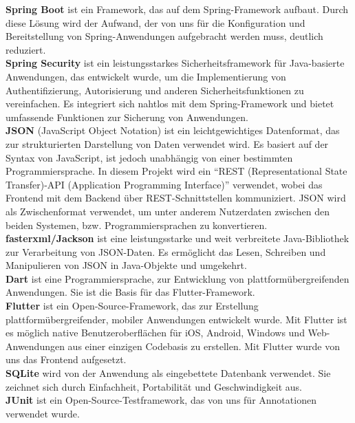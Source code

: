 \textbf{Spring Boot} ist ein Framework, das auf dem Spring-Framework aufbaut.
Durch diese Lösung wird der Aufwand, der von uns für die Konfiguration und Bereitstellung von Spring-Anwendungen aufgebracht werden muss, deutlich reduziert.\\

\textbf{Spring Security} ist ein leistungsstarkes Sicherheitsframework für Java-basierte Anwendungen, das entwickelt wurde,
um die Implementierung von Authentifizierung, Autorisierung und anderen Sicherheitsfunktionen zu vereinfachen.
Es integriert sich nahtlos mit dem Spring-Framework und bietet umfassende Funktionen zur Sicherung von Anwendungen.\\

\textbf{JSON} (JavaScript Object Notation) ist ein leichtgewichtiges Datenformat, das zur strukturierten Darstellung von Daten verwendet wird.
Es basiert auf der Syntax von JavaScript, ist jedoch unabhängig von einer bestimmten Programmiersprache.
In diesem Projekt wird ein \enquote{REST (Representational State Transfer)-API (Application Programming Interface)} verwendet,
wobei das Frontend mit dem Backend über REST-Schnittstellen kommuniziert.
JSON wird als Zwischenformat verwendet, um unter anderem Nutzerdaten zwischen den beiden Systemen, bzw. Programmiersprachen zu konvertieren.\\

\textbf{fasterxml/Jackson} ist eine leistungsstarke und weit verbreitete Java-Bibliothek zur Verarbeitung von JSON-Daten.
Es ermöglicht das Lesen, Schreiben und Manipulieren von JSON in Java-Objekte und umgekehrt.\\

\textbf{Dart} ist eine Programmiersprache, zur Entwicklung von plattformübergreifenden Anwendungen.
Sie ist die Basis für das Flutter-Framework.\\

\textbf{Flutter} ist ein Open-Source-Framework, das zur Erstellung plattformübergreifender, mobiler Anwendungen entwickelt wurde.
Mit Flutter ist es möglich native Benutzeroberflächen für iOS, Android, Windows und Web-Anwendungen aus einer einzigen Codebasis zu erstellen.
Mit Flutter wurde von uns das Frontend aufgesetzt. \\

\textbf{SQLite} wird von der Anwendung als eingebettete Datenbank verwendet.
Sie zeichnet sich durch Einfachheit, Portabilität und Geschwindigkeit aus.\\

\textbf{JUnit} ist ein Open-Source-Testframework, das von uns für Annotationen verwendet wurde.\\

